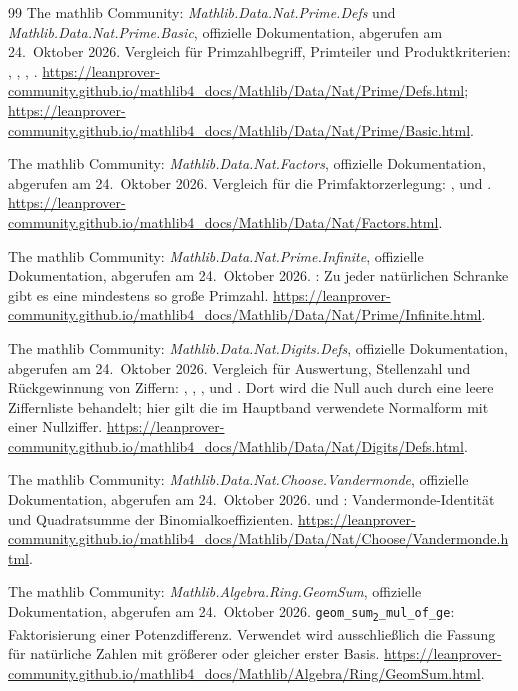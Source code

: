 \begin{thebibliography}{99}
The mathlib Community: \emph{Mathlib.Data.Nat.Prime.Defs} und
\emph{Mathlib.Data.Nat.Prime.Basic}, offizielle Dokumentation,
abgerufen am 24.~Oktober 2026.
Vergleich für Primzahlbegriff, Primteiler und Produktkriterien:
, ,
,
.
\url{https://leanprover-community.github.io/mathlib4_docs/Mathlib/Data/Nat/Prime/Defs.html};
\url{https://leanprover-community.github.io/mathlib4_docs/Mathlib/Data/Nat/Prime/Basic.html}.

The mathlib Community: \emph{Mathlib.Data.Nat.Factors},
offizielle Dokumentation, abgerufen am 24.~Oktober 2026.
Vergleich für die Primfaktorzerlegung:
, 
und .
\url{https://leanprover-community.github.io/mathlib4_docs/Mathlib/Data/Nat/Factors.html}.

The mathlib Community: \emph{Mathlib.Data.Nat.Prime.Infinite},
offizielle Dokumentation, abgerufen am 24.~Oktober 2026.
: Zu jeder natürlichen Schranke
gibt es eine mindestens so große Primzahl.
\url{https://leanprover-community.github.io/mathlib4_docs/Mathlib/Data/Nat/Prime/Infinite.html}.

The mathlib Community: \emph{Mathlib.Data.Nat.Digits.Defs},
offizielle Dokumentation, abgerufen am 24.~Oktober 2026.
Vergleich für Auswertung, Stellenzahl und Rückgewinnung von Ziffern:
, ,
,
 und
.
Dort wird die Null auch durch eine leere Ziffernliste behandelt;
hier gilt die im Hauptband verwendete Normalform mit einer Nullziffer.
\url{https://leanprover-community.github.io/mathlib4_docs/Mathlib/Data/Nat/Digits/Defs.html}.

The mathlib Community: \emph{Mathlib.Data.Nat.Choose.Vandermonde},
offizielle Dokumentation, abgerufen am 24.~Oktober 2026.
 und :
Vandermonde-Identität und Quadratsumme der Binomialkoeffizienten.
\url{https://leanprover-community.github.io/mathlib4_docs/Mathlib/Data/Nat/Choose/Vandermonde.html}.

The mathlib Community: \emph{Mathlib.Algebra.Ring.GeomSum},
offizielle Dokumentation, abgerufen am 24.~Oktober 2026.
\texttt{geom\_sum\textsubscript{2}\_mul\_of\_ge}: Faktorisierung einer Potenzdifferenz.
Verwendet wird ausschließlich die Fassung für natürliche Zahlen
mit größerer oder gleicher erster Basis.
\url{https://leanprover-community.github.io/mathlib4_docs/Mathlib/Algebra/Ring/GeomSum.html}.


\end{thebibliography}
